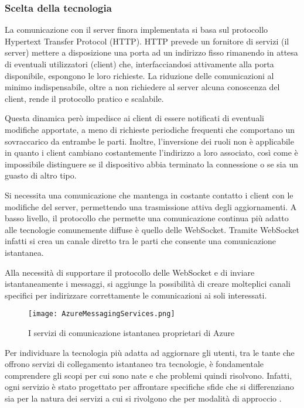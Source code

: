 \subsubsection{Scelta della tecnologia}


La comunicazione con il server finora implementata si basa sul protocollo Hypertext Transfer Protocol (HTTP). HTTP prevede un fornitore di servizi (il server) mettere a disposizione una porta ad un indirizzo fisso rimanendo in attesa di eventuali utilizzatori (client) che, interfacciandosi attivamente alla porta disponibile,  espongono le loro richieste.
La riduzione delle comunicazioni al minimo indispensabile, oltre a non richiedere al server alcuna conoscenza del client, rende il protocollo pratico e scalabile.

Questa dinamica però impedisce ai client di essere notificati di eventuali modifiche apportate, a meno di richieste periodiche frequenti che comportano un sovraccarico da entrambe le parti. Inoltre, l’inversione dei ruoli non è applicabile in quanto i client cambiano costantemente l’indirizzo a loro associato, così come è impossibile distinguere se il dispositivo abbia terminato la connessione o se sia un guasto di altro tipo. 

Si necessita una comunicazione che mantenga in costante contatto i client con le modifiche del server, permettendo una trasmissione attiva degli aggiornamenti.
A basso livello, il protocollo che permette una comunicazione continua più adatto alle tecnologie comunemente diffuse è quello delle WebSocket. Tramite WebSocket infatti si crea un canale diretto tra le parti che consente una comunicazione istantanea. 

Alla necessità di supportare il protocollo delle WebSocket e di inviare istantaneamente i messaggi, si aggiunge la possibilità di creare molteplici canali specifici per indirizzare correttamente le comunicazioni ai soli interessati.


\begin{figure}[h!]
    \centering
    \texttt{[image: AzureMessagingServices.png]}
    \caption{I servizi di comunicazione istantanea proprietari di Azure}
\end{figure}	


Per individuare la tecnologia più adatta ad aggiornare gli utenti, tra le tante che offrono servizi di collegamento istantaneo tra tecnologie, è fondamentale comprendere  gli scopi per cui sono nate e che problemi quindi risolvono. Infatti, ogni servizio è stato progettato per affrontare specifiche sfide che si differenziano sia per la natura dei servizi a cui si rivolgono che per  modalità di approccio .

